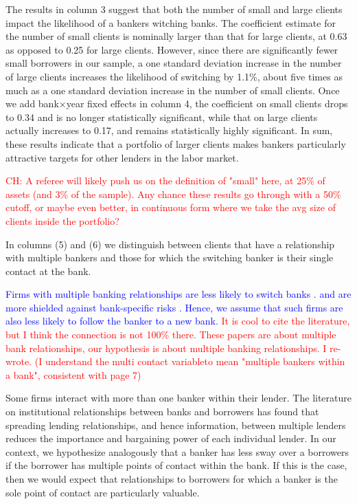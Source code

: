 The results in column 3 suggest that both the number of small and large clients impact the likelihood of a bankers witching banks. The coefficient estimate for the number of small clients is nominally larger than that for large clients, at 0.63 as opposed to 0.25 for large clients. However, since there are significantly fewer small borrowers in our sample, a one standard deviation increase in the number of large clients increases the likelihood of switching by 1.1\%, about five times as much as a one standard deviation increase in the number of small clients. %
Once we add bank$\times$year fixed effects in column 4, the coefficient on small clients drops to 0.34 and is no longer statistically significant, while that on large clients actually increases to 0.17, and remains statistically highly significant. In sum, these results indicate that a portfolio of larger clients makes bankers particularly attractive targets for other lenders in the labor market.

\textcolor{red}{CH: A referee will likely push us on the definition of "small" here, at 25\% of assets (and 3\% of the sample). Any chance these results go through with a 50\% cutoff, or maybe even better, in continuous form where we take the avg size of clients inside the portfolio?}

In columns (5) and (6) we distinguish between clients that have a relationship with multiple bankers and those for which the switching banker is their single contact at the bank. 

\textcolor{blue}{Firms with multiple banking relationships are less likely to switch banks \citep{Ioannidou.2010b}. and are more shielded against bank-specific risks \citep{Degryse.2011}. Hence, we assume that such firms are also less likely to follow the banker to a new bank.} \textcolor{red}{It is cool to cite the literature, but I think the connection is not 100\% there. These papers are about multiple bank relationships, our hypothesis is about multiple banking relationships. I re-wrote. (I understand the multi contact variableto mean "multiple bankers within a bank", consistent with page 7)}

Some firms interact with more than one banker within their lender. The literature on institutional relationships between banks and borrowers has found that spreading lending relationships, and hence information, between multiple lenders reduces the importance and bargaining power of each individual lender. In our context, we hypothesize analogously that a banker has less sway over a borrowers if  the borrower has multiple points of contact within the bank. If this is the case, then we would expect that relationships to borrowers for which a banker is the sole point of contact are particularly valuable. 


